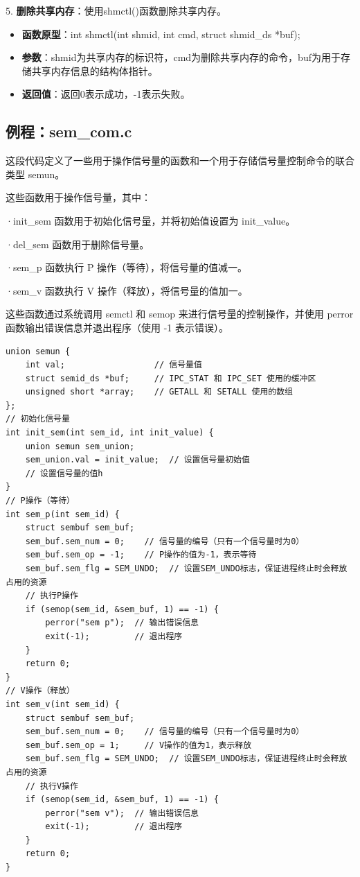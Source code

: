 \documentclass[12pt, a4paper, oneside]{ctexbook}
\numberwithin{figure}{section}
\begin{document}
5. \textbf{删除共享内存}：使用shmctl()函数删除共享内存。
   \begin{itemize}
       \item \textbf{函数原型}：int shmctl(int shmid, int cmd, struct shmid_ds *buf);
       \item \textbf{参数}：shmid为共享内存的标识符，cmd为删除共享内存的命令，buf为用于存储共享内存信息的结构体指针。
       \item \textbf{返回值}：返回0表示成功，-1表示失败。
   \end{itemize}

\subsection{例程：sem_com.c}
这段代码定义了一些用于操作信号量的函数和一个用于存储信号量控制命令的联合类型 semun。

这些函数用于操作信号量，其中：

·init_sem 函数用于初始化信号量，并将初始值设置为 init_value。

·del_sem 函数用于删除信号量。

·sem_p 函数执行 P 操作（等待），将信号量的值减一。

·sem_v 函数执行 V 操作（释放），将信号量的值加一。

这些函数通过系统调用 semctl 和 semop 来进行信号量的控制操作，并使用 perror 函数输出错误信息并退出程序（使用 -1 表示错误）。

\begin{verbatim}
union semun {
    int val;                  // 信号量值
    struct semid_ds *buf;     // IPC_STAT 和 IPC_SET 使用的缓冲区
    unsigned short *array;    // GETALL 和 SETALL 使用的数组
};
// 初始化信号量
int init_sem(int sem_id, int init_value) {
    union semun sem_union;
    sem_union.val = init_value;  // 设置信号量初始值
    // 设置信号量的值h
}
// P操作（等待）
int sem_p(int sem_id) {
    struct sembuf sem_buf;
    sem_buf.sem_num = 0;    // 信号量的编号（只有一个信号量时为0）
    sem_buf.sem_op = -1;    // P操作的值为-1，表示等待
    sem_buf.sem_flg = SEM_UNDO;  // 设置SEM_UNDO标志，保证进程终止时会释放占用的资源
    // 执行P操作
    if (semop(sem_id, &sem_buf, 1) == -1) {
        perror("sem p");  // 输出错误信息
        exit(-1);         // 退出程序
    }
    return 0;
}
// V操作（释放）
int sem_v(int sem_id) {
    struct sembuf sem_buf;
    sem_buf.sem_num = 0;    // 信号量的编号（只有一个信号量时为0）
    sem_buf.sem_op = 1;     // V操作的值为1，表示释放
    sem_buf.sem_flg = SEM_UNDO;  // 设置SEM_UNDO标志，保证进程终止时会释放占用的资源
    // 执行V操作
    if (semop(sem_id, &sem_buf, 1) == -1) {
        perror("sem v");  // 输出错误信息
        exit(-1);         // 退出程序
    }
    return 0;
}
\end{verbatim}
\end{document}

